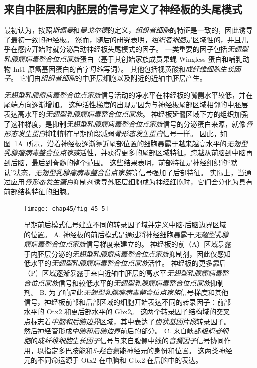 \subsection{来自中胚层和内胚层的信号定义了神经板的头尾模式}

最初认为，按照\textit{斯佩曼}和\textit{曼戈尔德}的定义，\textit{组织者细胞}的特征是一致的，因此诱导了最初一致的神经板。
然而，随后的研究表明，\textit{组织者细胞}是区域性的，并且几乎在感应开始时就分泌启动神经板头尾模式的因子。
一类重要的因子包括\textit{无翅型乳腺瘤病毒整合位点家族}蛋白（基于其创始家族成员果蝇 Wingless 蛋白和哺乳动物 Int1 原癌基因蛋白的首字母缩写词）。
其他包括视黄酸和\textit{成纤维细胞生长因子}。
它们由\textit{组织者细胞}的中胚层细胞以及附近的近轴中胚层产生。


\textit{无翅型乳腺瘤病毒整合位点家族}信号活动的净水平在神经板的嘴侧水平较低，并在尾端方向逐渐增加。
这种活性梯度的出现是因为与神经板尾部区域相邻的中胚层表达高水平的\textit{无翅型乳腺瘤病毒整合位点家族}。
神经板延髓区域下方的组织加强了这种梯度，是抑制\textit{无翅型乳腺瘤病毒整合位点家族}信号的分泌蛋白来源，就像\textit{骨形态发生蛋白}抑制剂在早期阶段减弱\textit{骨形态发生蛋白}信号一样。
因此，如图~\ref{fig:45_5}A~所示，沿着神经板逐渐靠近尾部位置的细胞暴露于越来越高水平的\textit{无翅型乳腺瘤病毒整合位点家族}活性，并获得更多的尾部区域特征，跨越从前脑到中脑再到后脑，最后到脊髓的整个范围。
这些结果表明，前部特征是神经组织的“默认”状态，\textit{无翅型乳腺瘤病毒整合位点家族}等信号强加了后部特征。
实际上，当通过应用\textit{骨形态发生蛋白}抑制剂诱导外胚层细胞成为神经细胞时，它们会分化为具有前部结构特征的细胞。


\begin{figure}[htbp]
	\centering
	\texttt{[image: chap45/fig\_45\_5]}
	\caption{早期前后模式信号建立不同的转录因子域并定义中脑-后脑边界区域的位置。
		A. 神经板的前后模式是通过将神经细胞暴露于\textit{无翅型乳腺瘤病毒整合位点家族}信号梯度来建立的。
		神经板的前（A）区域暴露于内胚层分泌的\textit{无翅型乳腺瘤病毒整合位点家族}抑制剂，因此仅感知低水平的\textit{无翅型乳腺瘤病毒整合位点家族}活性。
		神经板的更多靠后（P）区域逐渐暴露于来自近轴中胚层的高水平\textit{无翅型乳腺瘤病毒整合位点家族}信号和较低水平的\textit{无翅型乳腺瘤病毒整合位点家族}抑制剂。
		B. 为了响应此\textit{无翅型乳腺瘤病毒整合位点家族}信号梯度和其他信号，神经板前部和后部区域的细胞开始表达不同的转录因子：前部水平的 Otx2 和更后部水平的 Gbx2。
		这两个转录因子结构域的交叉点标志着\textit{中脑和后脑边界}区域，其中表达了\textit{齿状基因片段}转录因子。
		然后神经管形成\textit{中脑和后脑边界}前后的部分。
		C. 来自峡部\textit{组织者细胞}的\textit{成纤维细胞生长因子}信号与来自腹侧中线的\textit{音猬因子}信号协同作用，以指定多巴胺能和\textit{5-羟色氨}能神经元的身份和位置。
		这两类神经元的不同命运源于 Otx2 在中脑和 Gbx2 在后脑中的表达\cite{wurst2001neural}。}
	\label{fig:45_5}
\end{figure}



